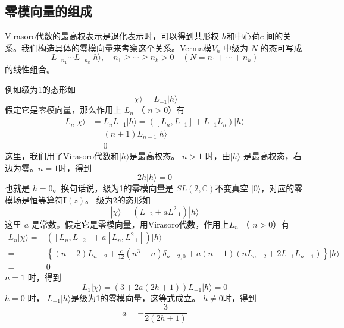 \subsection{零模向量的组成}
Virasoro代数的最高权表示是退化表示时，可以得到共形权 $h $和中心荷$c$ 间的关系。我们构造具体的零模向量来考察这个关系。Verma模$ V_h$ 中级为 $N$ 的态可写成
$$
L_{-n_{1}} \cdots L_{-n_{k}}|h\rangle, \quad n_{1} \geq \cdots \geq n_{k}>0 \quad (N=n_{1}+\cdots+n_{k})
$$
的线性组合。

例如级为1的态形如
\begin{equation}
	|\chi\rangle=L_{-1}|h\rangle
\end{equation}
假定它是零模向量，那么作用上 $L_n$ （ $n>0 $）有
\begin{equation}
\begin{aligned} L_{n}|\chi\rangle &=L_{n} L_{-1}|h\rangle=\left(\left[L_{n}, L_{-1}\right]+L_{-1} L_{n}\right)|h\rangle \\ &=(n+1) L_{n-1}|h\rangle \\ &=0 \end{aligned}
\end{equation}
这里，我们用了Virasoro代数和$ |h\rangle $是最高权态。 $n>1$ 时，由$ |h\rangle$ 是最高权态，右边为零。$ n=1 $时，得到
$$
2 h|h\rangle=0
$$
也就是 $h=0 $。换句话说，级为1的零模向量是 $SL(2,\mathbb{C}) $不变真空 $|0\rangle $，对应的零模场是恒等算符$ \boldsymbol{I}(z) $。
级为2的态形如
\begin{equation}
|\chi\rangle=\left(L_{-2}+a L_{-1}^{2}\right)|h\rangle
\end{equation}
这里 $a$ 是常数。假定它是零模向量，用Virasoro代数，作用上$ L_n$ （ $n>0 $）有
\begin{equation}
	\begin{aligned} L_{n}|\chi\rangle=&\left(\left[L_{n}, L_{-2}\right]+a [L_{n}, L_{-1}^{2} ]\right)|h\rangle \\ =&\left\{(n+2) L_{n-2}+\frac{c}{12}\left(n^{3}-n\right) \delta_{n-2,0}+a(n+1)\left(n L_{n-2}+2 L_{-1} L_{n-1}\right)\right\}|h\rangle \\ =& 0 \end{aligned}
\end{equation}
$n=1$ 时，得到
\begin{equation}
	L_{1}|\chi\rangle=(3+2 a(2 h+1)) L_{-1}|h\rangle=0
\end{equation}
$h=0$ 时， $L_{-1}|h\rangle $是级为1的零模向量，这等式成立。 $h\neq 0 $时，得到
\begin{equation}
	a=-\frac{3}{2(2 h+1)}
\end{equation}
